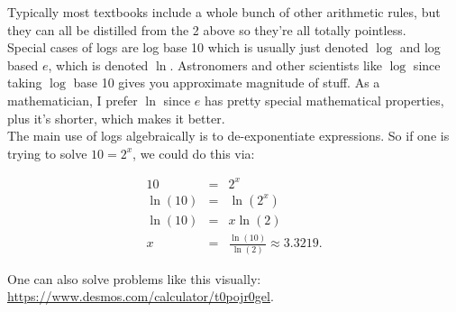\documentclass[10pt]{article}
\theoremstyle{definition}
\begin{document}
Typically most textbooks include a whole bunch of other arithmetic rules, but they can all be distilled from the 2 above so they're all totally pointless.\\

Special cases of logs are log base 10 which is usually just denoted $\log$ and log based $e$, which is denoted $\ln$.  Astronomers and other scientists like $\log$ since taking $\log$ base 10 gives you approximate magnitude of stuff.  As a mathematician, I prefer $\ln$ since $e$ has pretty special mathematical properties, plus it's shorter, which makes it better.\\

The main use of logs algebraically is to de-exponentiate expressions.  So if one is trying to solve $10=2^x$, we could do this via:

\begin{eqnarray*}
10&=&2^x\\
\ln(10)&=&\ln(2^x)\\
\ln(10)&=&x\ln(2)\\
x&=&\frac{\ln(10)}{\ln(2)}\approx 3.3219.
\end{eqnarray*}

One can also solve problems like this visually:  \url{https://www.desmos.com/calculator/t0pojr0gel}.
\end{document}
